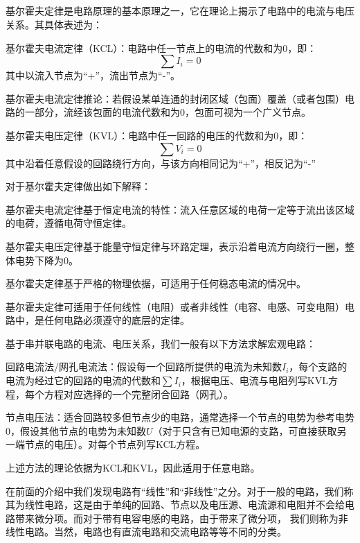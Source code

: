 \subsection[基尔霍夫定律]{}
基尔霍夫定律是电路原理的基本原理之一，它在理论上揭示了电路中的电流与电压关系。其具体表述为：
\begin{Itemize}
    \item 基尔霍夫电流定律（KCL）：电路中任一节点上的电流的代数和为0，即：
    \[\sum I_i=0\]
    其中以流入节点为“+”，流出节点为“-”。
    \item 基尔霍夫电流定律推论：若假设某单连通的封闭区域（包面）覆盖（或者包围）电路的一部分，流经该包面的电流代数和为0，包面可视为一个广义节点。
    \item 基尔霍夫电压定律（KVL）：电路中任一回路的电压的代数和为0，即：
    \[\sum V_i=0\]
    其中沿着任意假设的回路绕行方向，与该方向相同记为“+”，相反记为“-”
\end{Itemize}

对于基尔霍夫定律做出如下解释：
\begin{Itemize}
    \item 基尔霍夫电流定律基于恒定电流的特性：流入任意区域的电荷一定等于流出该区域的电荷，遵循电荷守恒定律。
    \item 基尔霍夫电压定律基于能量守恒定律与环路定理，表示沿着电流方向绕行一圈，整体电势下降为0。
    \item 基尔霍夫定律基于严格的物理依据，可适用于任何稳态电流的情况中。
    \item 基尔霍夫定律可适用于任何线性（电阻）或者非线性（电容、电感、可变电阻）电路中，是任何电路必须遵守的底层的定律。
\end{Itemize}

基于串并联电路的电流、电压关系，我们一般有以下方法求解宏观电路：
\begin{Itemize}
    \item 回路电流法/网孔电流法：假设每一个回路所提供的电流为未知数$I_i$，每个支路的电流为经过它的回路的电流的代数和$\sum I_i$，根据电压、电流与电阻列写KVL方程，每个方程对应选择的一个完整闭合回路（网孔）。
    \item 节点电压法：适合回路较多但节点少的电路，通常选择一个节点的电势为参考电势0，假设其他节点的电势为未知数$U$（对于只含有已知电源的支路，可直接获取另一端节点的电压）。对每个节点列写KCL方程。
    \item 上述方法的理论依据为KCL和KVL，因此适用于任意电路。
\end{Itemize}

在前面的介绍中我们发现电路有“线性”和“非线性”之分。对于一般的电路，我们称其为线性电路，这是由于单纯的回路、节点以及电压源、电流源和电阻并不会给电路带来微分项。而对于带有电容电感的电路，由于带来了微分项，
我们则称为非线性电路。当然，电路也有直流电路和交流电路等等不同的分类。
